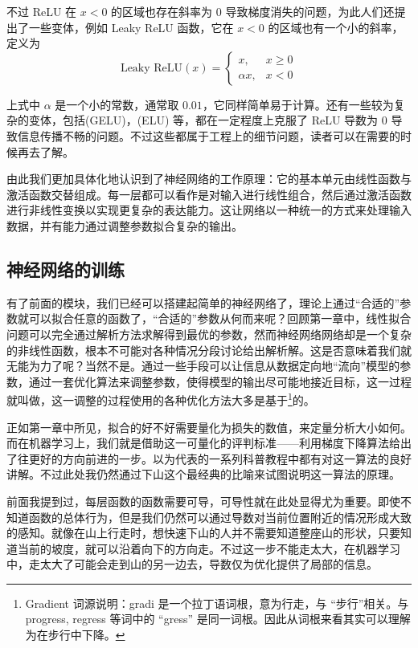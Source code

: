 不过 ReLU 在 $x<0$ 的区域也存在斜率为 $0$ 导致梯度消失的问题，为此人们还提出了一些变体，例如 Leaky ReLU 函数，它在 $x<0$ 的区域也有一个小的斜率，定义为
\[
    \text{Leaky ReLU}(x) = \begin{cases}
        x, & x \geq 0 \\
        \alpha x, & x < 0 
    \end{cases}
\]

上式中 $\alpha$ 是一个小的常数，通常取 $0.01$，它同样简单易于计算。还有一些较为复杂的变体，包括(GELU)，(ELU) 等，都在一定程度上克服了 ReLU 导数为 $0$ 导致信息传播不畅的问题。不过这些都属于工程上的细节问题，读者可以在需要的时候再去了解。

由此我们更加具体化地认识到了神经网络的工作原理：它的基本单元由线性函数与激活函数交替组成。每一层都可以看作是对输入进行线性组合，然后通过激活函数进行非线性变换以实现更复杂的表达能力。这让网络以一种统一的方式来处理输入数据，并有能力通过调整参数拟合复杂的输出。

\newpage

\subsection{神经网络的训练}

有了前面的模块，我们已经可以搭建起简单的神经网络了，理论上通过“合适的”参数就可以拟合任意的函数了，“合适的”参数从何而来呢？回顾第一章中，线性拟合问题可以完全通过解析方法求解得到最优的参数，然而神经网络网络却是一个复杂的非线性函数，根本不可能对各种情况分段讨论给出解析解。这是否意味着我们就无能为力了呢？当然不是。通过一些手段可以让信息从数据定向地“流向”模型的参数，通过一套优化算法来调整参数，使得模型的输出尽可能地接近目标，这一过程就叫做，这一调整的过程使用的各种优化方法大多是基于\footnote{Gradient 词源说明：gradi 是一个拉丁语词根，意为行走，与 “步行”相关。与 progress, regress 等词中的 “gress” 是同一词根。因此从词根来看其实可以理解为在步行中下降。}的。

正如第一章中所见，拟合的好不好需要量化为损失的数值，来定量分析大小如何。而在机器学习上，我们就是借助这一可量化的评判标准——利用梯度下降算法给出了往更好的方向前进的一步。以为代表的一系列科普教程中都有对这一算法的良好讲解。不过此处我仍然通过下山这个最经典的比喻来试图说明这一算法的原理。

前面我提到过，每层函数的函数需要可导，可导性就在此处显得尤为重要。即使不知道函数的总体行为，但是我们仍然可以通过导数对当前位置附近的情况形成大致的感知。就像在山上行走时，想快速下山的人并不需要知道整座山的形状，只要知道当前的坡度，就可以沿着向下的方向走。不过这一步不能走太大，在机器学习中，走太大了可能会走到山的另一边去，导数仅为优化提供了局部的信息。

